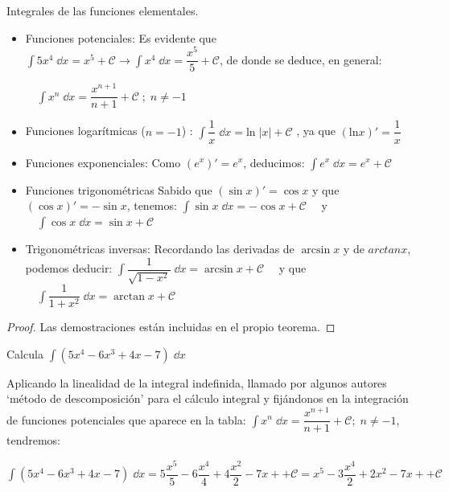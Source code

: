 	\begin{teor} Integrales de las funciones elementales.	
	\begin{itemize}
		\item Funciones potenciales: Es evidente que $\int 5x^4\; \dd x= x^5 + \mathcal C \to \int x^4\; \dd x = \dfrac {x^5}{5} + \mathcal C$, de donde se deduce, en general: 
		
		$ \quad \boxed{  \int x^n \; \dd x = \dfrac {x^{n+1}}{n+1} + \mathcal C \; ; \; n\neq -1 } $
		
		\item Funciones logarítmicas ($n=-1$) :  $ \boxed{ \displaystyle  \int \dfrac 1 x \; \dd x = \mathrm{ln} \;  |x| + \mathcal {C} } $ , ya que $(\mathrm{ln} x)'=\dfrac 1 x$
		
		\item Funciones exponenciales: Como $(e^x)'=e^x$, deducimos: $\boxed{ \int e^x \; \dd x = e^x + \mathcal C }$
		
		\item Funciones trigonométricas Sabido que $(\sin x)'=\cos x$ y que $(\cos x)'=-\sin x$, tenemos: $\boxed{ \int \sin x \; \dd x= - \cos x + \mathcal C } \quad$ y $\quad \boxed{ \int \cos x \; \dd x=  \sin x + \mathcal C } $
		\item Trigonométricas inversas: Recordando las derivadas de $\arcsin x$ y de $arctan x$, podemos deducir: $\boxed{\displaystyle  \int \dfrac {1}{\sqrt{1-x^2}} \; \dd x = \arcsin x + \mathcal C } \quad $ y que $\quad \boxed{\displaystyle  \int \dfrac {1}{1+x^2} \; \dd x = \arctan x + \mathcal C } $
	\end{itemize}
	\end{teor}
	\begin{proof}
		Las demostraciones están incluidas en el propio teorema.
	\end{proof}

\begin{ejem}
Calcula $\int (5x^4-6x^3+4x-7) \; \dd x$	

Aplicando la linealidad de la integral indefinida, llamado por algunos autores `método de descomposición' para el cálculo integral y fijándonos en la integración de funciones potenciales que aparece en la tabla: $\displaystyle \int x^n \; \dd x = \dfrac {x^{n+1}}{n+1} +\mathcal{C}; \; n\neq -1$, tendremos:
	
	$\int (5x^4-6x^3+4x-7) \; \dd x= 5 \dfrac {x^5}{5}-6 \dfrac {x^4}{4} + 4 \dfrac {x^2}{2} -7x + +\mathcal{C} =	 x^5-3 \dfrac {x^4}{2} + 2 x^2 -7x + +\mathcal{C} $

\end{ejem}	


